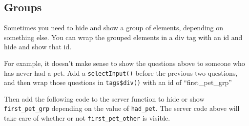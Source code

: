 \documentclass[
]{book}
\newenvironment{Shaded}{\begin{snugshade}}{\end{snugshade}}
\newcommand{\AttributeTok}[1]{\textcolor[rgb]{0.77,0.63,0.00}{#1}}
\newcommand{\CommentTok}[1]{\textcolor[rgb]{0.56,0.35,0.01}{\textit{#1}}}
\newcommand{\ConstantTok}[1]{\textcolor[rgb]{0.00,0.00,0.00}{#1}}
\newcommand{\ControlFlowTok}[1]{\textcolor[rgb]{0.13,0.29,0.53}{\textbf{#1}}}
\newcommand{\FunctionTok}[1]{\textcolor[rgb]{0.00,0.00,0.00}{#1}}
\newcommand{\NormalTok}[1]{#1}
\newcommand{\SpecialCharTok}[1]{\textcolor[rgb]{0.00,0.00,0.00}{#1}}
\newcommand{\StringTok}[1]{\textcolor[rgb]{0.31,0.60,0.02}{#1}}
\begin{document}
\hypertarget{groups}{%
\subsection{Groups}\label{groups}}

Sometimes you need to hide and show a group of elements, depending on something else. You can wrap the grouped elements in a div tag with an id and hide and show that id.

For example, it doesn't make sense to show the questions above to someone who has never had a pet. Add a \texttt{selectInput()} before the previous two questions, and then wrap those questions in \texttt{tags\$div()} with an id of ``first\_pet\_grp''

\begin{Shaded}
\end{Shaded}

Then add the following code to the server function to hide or show \texttt{first\_pet\_grp} depending on the value of \texttt{had\_pet}. The server code above will take care of whether or not \texttt{first\_pet\_other} is visible.

\begin{Shaded}
\end{Shaded}
\end{document}
